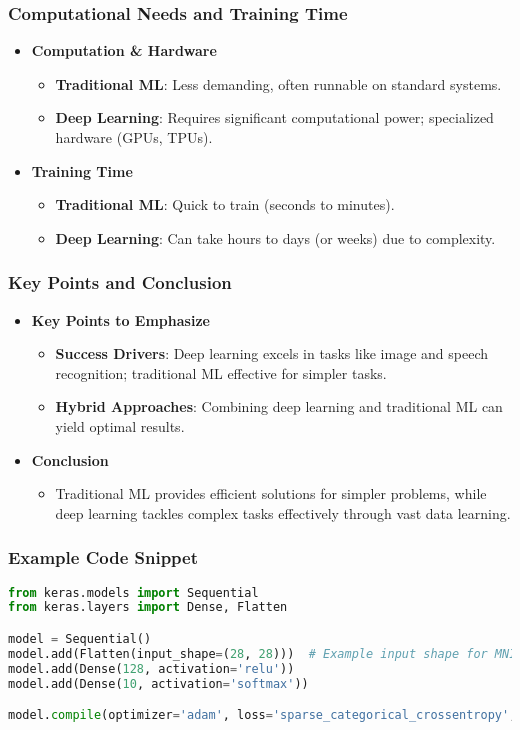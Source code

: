 \documentclass[aspectratio=169]{beamer}
\begin{document}
\begin{frame}[fragile]
    \frametitle{Computational Needs and Training Time}
    \begin{itemize}
        \item \textbf{Computation \& Hardware}
        \begin{itemize}
            \item \textbf{Traditional ML}: Less demanding, often runnable on standard systems.
            \item \textbf{Deep Learning}: Requires significant computational power; specialized hardware (GPUs, TPUs).
        \end{itemize}
        \item \textbf{Training Time}
        \begin{itemize}
            \item \textbf{Traditional ML}: Quick to train (seconds to minutes).
            \item \textbf{Deep Learning}: Can take hours to days (or weeks) due to complexity.
        \end{itemize}
    \end{itemize}
\end{frame}

\begin{frame}[fragile]
    \frametitle{Key Points and Conclusion}
    \begin{itemize}
        \item \textbf{Key Points to Emphasize}
        \begin{itemize}
            \item \textbf{Success Drivers}: Deep learning excels in tasks like image and speech recognition; traditional ML effective for simpler tasks.
            \item \textbf{Hybrid Approaches}: Combining deep learning and traditional ML can yield optimal results.
        \end{itemize}
        \item \textbf{Conclusion}
        \begin{itemize}
            \item Traditional ML provides efficient solutions for simpler problems, while deep learning tackles complex tasks effectively through vast data learning.
        \end{itemize}
    \end{itemize}
\end{frame}

\begin{frame}[fragile]
    \frametitle{Example Code Snippet}
    \begin{lstlisting}[language=Python]
from keras.models import Sequential
from keras.layers import Dense, Flatten

model = Sequential()
model.add(Flatten(input_shape=(28, 28)))  # Example input shape for MNIST
model.add(Dense(128, activation='relu'))
model.add(Dense(10, activation='softmax'))

model.compile(optimizer='adam', loss='sparse_categorical_crossentropy', metrics=['accuracy'])
    \end{lstlisting}
\end{frame}
\end{document}
